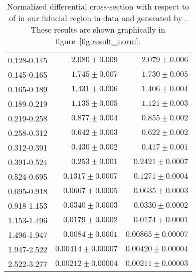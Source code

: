 \begin{table}
\begin{center}
\begin{tabular}{@{}l r r@{}}
            0.128-0.145  &  $2.080    \pm  0.009$    &  $2.079    \pm  0.006$    \\
            0.145-0.165  &  $1.745    \pm  0.007$    &  $1.730    \pm  0.005$    \\
            0.165-0.189  &  $1.431    \pm  0.006$    &  $1.406    \pm  0.004$    \\
            0.189-0.219  &  $1.135    \pm  0.005$    &  $1.121    \pm  0.003$    \\
            0.219-0.258  &  $0.877    \pm  0.004$    &  $0.855    \pm  0.002$    \\
            0.258-0.312  &  $0.642    \pm  0.003$    &  $0.622    \pm  0.002$    \\
            0.312-0.391  &  $0.430    \pm  0.002$    &  $0.417    \pm  0.001$    \\
            0.391-0.524  &  $0.253    \pm  0.001$    &  $0.2421   \pm  0.0007$   \\
            0.524-0.695  &  $0.1317   \pm  0.0007$   &  $0.1271   \pm  0.0004$   \\
            0.695-0.918  &  $0.0667   \pm  0.0005$   &  $0.0635   \pm  0.0003$   \\
            0.918-1.153  &  $0.0340   \pm  0.0003$   &  $0.0330   \pm  0.0002$   \\
            1.153-1.496  &  $0.0179   \pm  0.0002$   &  $0.0174   \pm  0.0001$   \\
            1.496-1.947  &  $0.0084   \pm  0.0001$   &  $0.00865  \pm  0.00007$  \\
            1.947-2.522  &  $0.00414  \pm  0.00007$  &  $0.00420  \pm  0.00004$  \\
            2.522-3.277  &  $0.00212  \pm  0.00004$  &  $0.00211  \pm  0.00003$  \\
            \bottomrule
        \end{tabular}
    \end{center}
    \caption[
        Normalized differential cross-section with respect to \phistar of
        \Ztoee.
    ]{
        Normalized differential cross-section with respect to \phistar of
        \Ztoee in our fiducial region in data and generated by \MADGRAPH. These
        results are shown graphically in figure~\ref{fig:result_norm}.
    }
    \label{tab:results_norm}
\end{table}
